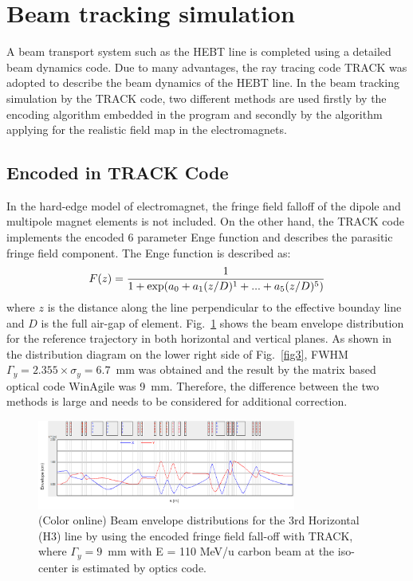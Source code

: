 \documentclass[jkps,preprint,fleqn,showpacs,showkeys,10pt,twocolumn]{revtex4}
\begin{document}
\section{Beam tracking simulation}
\label{sec:TRACK}
A beam transport system such as the HEBT line is completed using a detailed beam dynamics code.
Due to many advantages, the ray tracing code TRACK\cite{TRACK} was adopted to describe the beam dynamics of the HEBT line.
In the beam tracking simulation by the TRACK code, two different methods are used firstly by the encoding algorithm embedded in the program
and secondly by the algorithm applying for the realistic field map in the electromagnets.


\subsection{Encoded in TRACK Code}
In the hard-edge model of electromagnet, the fringe field falloff of the dipole and multipole magnet elements is not included.
On the other hand, the TRACK code implements the encoded 6 parameter Enge function\cite{Enge} and describes the parasitic fringe field component.  
The Enge function is described as\cite{EngeTrack}:
\[
F(z) = \frac{1}{1+{\rm exp}(a_{0}+a_{1}(z/D)^{1}+...+a_{5}(z/D)^{5})} 
\]
where $z$ is the distance along the line perpendicular to the effective bounday line and $D$ is the full air-gap of element.
Fig.~\ref{fig2} shows the beam envelope distribution for the reference trajectory in both horizontal and vertical planes.
As shown in the distribution diagram on the lower right side of Fig.~\ref{fig3}, FWHM $\Gamma_{y} = 2.355 \times \sigma_{y} = 6.7$~mm was obtained
and the result by the matrix based optical code WinAgile was 9~mm.
Therefore, the difference between the two methods is large and needs to be considered for additional correction.
\begin{figure}[h]
  \begin{center}
    \includegraphics[width=8.5cm]{Fig03.png}      
    \caption{(Color online) Beam envelope distributions for the 3rd Horizontal (H3) line by using the encoded fringe field fall-off with TRACK, 
      where $\Gamma_{y} = 9$~mm with E = 110 MeV/u carbon beam at the iso-center is estimated by optics code.}
    \label{fig2}
  \end{center}
\end{figure}
\end{document}
